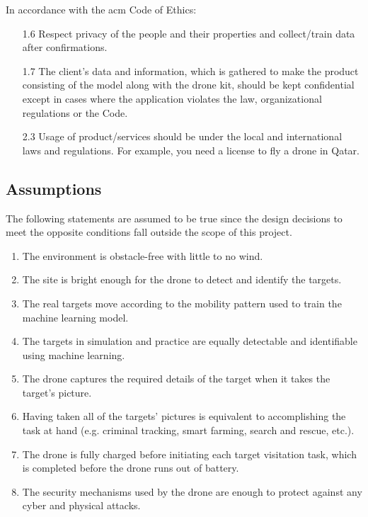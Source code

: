 \documentclass[../main.tex]{subfiles}
\begin{document}
\noindent
In accordance with the \gls{acm} Code of Ethics:
\begin{itemize}
    \item[1.6] Respect privacy of the people and their 
        properties and collect/train data after confirmations.
    \item[1.7] The client's data and information, which is gathered 
        to make the product consisting of the model along with 
        the drone kit, should be kept confidential except in cases 
        where the application violates the law, 
        organizational regulations or the Code.
    \item[2.3] Usage of product/services should be under 
        the local and international laws and regulations. 
        For example, you need a license to fly a drone in Qatar.
\end{itemize}

\subsection{Assumptions}

The following statements are assumed to be true
since the design decisions to meet the opposite
conditions fall outside the scope of this project.

\begin{enumerate}
    \item The environment is obstacle-free with little 
        to no wind.
    \item The site is bright enough for the drone to
        detect and identify the targets.
    \item The real targets move according to the mobility 
        pattern used to train the machine learning model.
    \item The targets in simulation and practice are 
        equally detectable and identifiable using 
        machine learning.
    \item The \anafi drone captures the 
        required details of the target 
        when it takes the target’s picture.
    \item Having taken all of the targets' pictures 
        is equivalent to accomplishing the task at hand 
        (e.g. criminal tracking, smart farming, 
        search and rescue, etc.).
    \item The \anafi drone is fully charged before 
        initiating each target visitation task,
        which is completed before the drone
        runs out of battery.
    \item The security mechanisms used by the \anafi
        drone are enough to protect against
        any cyber and physical attacks.
\end{enumerate}
\end{document}
